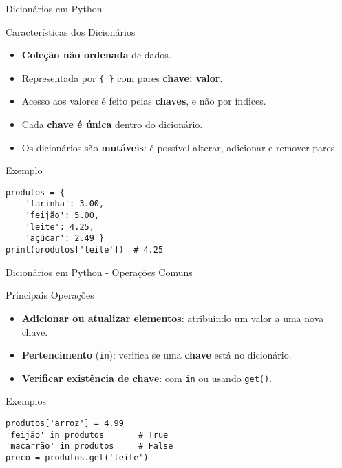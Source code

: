 \begin{frame}[fragile]{Dicionários em Python}

    \begin{block}{Características dos Dicionários}
        \begin{itemize}
            \item \textbf{Coleção não ordenada} de dados.
            \item Representada por \texttt{\{ \}} com pares \textbf{chave: valor}.
            \item Acesso aos valores é feito pelas \textbf{chaves}, e não por índices.
            \item Cada \textbf{chave é única} dentro do dicionário.
            \item Os dicionários são \textbf{mutáveis}: é possível alterar, adicionar e remover pares.
        \end{itemize}
    \end{block}

    \vspace{0.5em}

    \begin{block}{Exemplo}
        \begin{verbatim}
produtos = {
    'farinha': 3.00,
    'feijão': 5.00,
    'leite': 4.25,
    'açúcar': 2.49 }
print(produtos['leite'])  # 4.25
\end{verbatim}
    \end{block}

\end{frame}

\begin{frame}[fragile]{Dicionários em Python - Operações Comuns}


    \begin{block}{Principais Operações}
        \begin{itemize}
            \item \textbf{Adicionar ou atualizar elementos}: atribuindo um valor a uma nova chave.
            \item \textbf{Pertencimento} (\texttt{in}): verifica se uma \textbf{chave} está no dicionário.
            \item \textbf{Verificar existência de chave}: com \texttt{in} ou usando \texttt{get()}.
        \end{itemize}
    \end{block}


    \begin{block}{Exemplos}
        \begin{verbatim}
produtos['arroz'] = 4.99
'feijão' in produtos       # True
'macarrão' in produtos     # False
preco = produtos.get('leite')
\end{verbatim}
    \end{block}


\end{frame}


